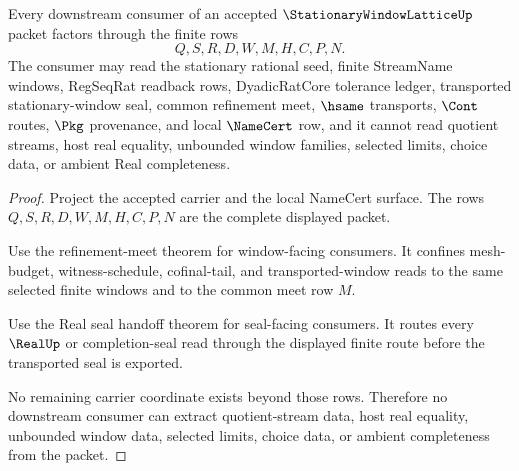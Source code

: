 \begin{theorem}
\label{thm:stationary-window-lattice-nonescape}
Every downstream consumer of an accepted $\StationaryWindowLatticeUp$ packet factors through the finite rows
$$
Q,S,R,D,W,M,H,C,P,N.
$$
The consumer may read the stationary rational seed, finite StreamName windows, RegSeqRat readback rows, DyadicRatCore tolerance ledger, transported stationary-window seal, common refinement meet, $\hsame$ transports, $\Cont$ routes, $\Pkg$ provenance, and local $\NameCert$ row, and it cannot read quotient streams, host real equality, unbounded window families, selected limits, choice data, or ambient Real completeness.
\end{theorem}
\begin{proof}
Project the accepted carrier and the local NameCert surface. The rows $Q,S,R,D,W,M,H,C,P,N$ are the complete displayed packet.

Use the refinement-meet theorem for window-facing consumers. It confines mesh-budget, witness-schedule, cofinal-tail, and transported-window reads to the same selected finite windows and to the common meet row $M$.

Use the Real seal handoff theorem for seal-facing consumers. It routes every $\RealUp$ or completion-seal read through the displayed finite route before the transported seal is exported.

No remaining carrier coordinate exists beyond those rows. Therefore no downstream consumer can extract quotient-stream data, host real equality, unbounded window data, selected limits, choice data, or ambient completeness from the packet.
\end{proof}


\begin{closurestatus}{\StationaryWindowLatticeUp}
  \theoryclosure{\seedClosure}
  \formalstatus{\unformalizedV}
\end{closurestatus}
